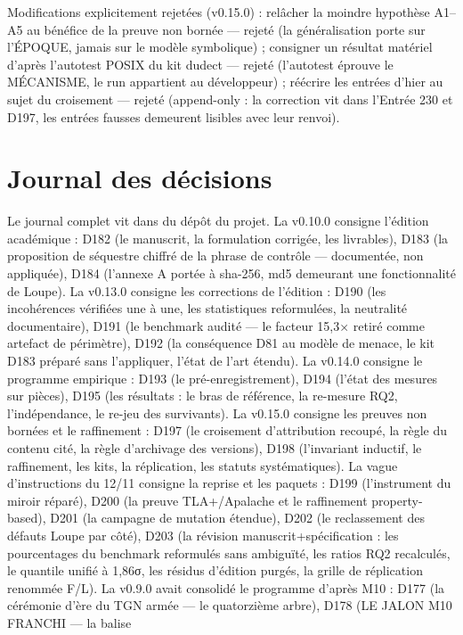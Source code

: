 Modifications explicitement rejetées (v0.15.0) : relâcher la moindre
hypothèse A1--A5 au bénéfice de la preuve non bornée — rejeté (la
généralisation porte sur l'ÉPOQUE, jamais sur le modèle symbolique) ;
consigner un résultat matériel d'après l'autotest POSIX du kit dudect —
rejeté (l'autotest éprouve le MÉCANISME, le run appartient au
développeur) ; réécrire les entrées d'hier au sujet du croisement —
rejeté (append-only : la correction vit dans l'Entrée 230 et D197, les
entrées fausses demeurent lisibles avec leur renvoi).

\section{Journal des décisions}\label{sec:decisions}

Le journal complet vit dans  du dépôt du projet. La
v0.10.0 consigne l'édition académique : D182 (le manuscrit, la formulation
corrigée, les livrables), D183 (la proposition de séquestre chiffré de la
phrase de contrôle — documentée, non appliquée), D184 (l'annexe A portée à
sha-256, md5 demeurant une fonctionnalité de Loupe). La v0.13.0 consigne
les corrections de l'édition : D190 (les incohérences vérifiées une à une,
les statistiques reformulées, la neutralité documentaire), D191 (le
benchmark audité — le facteur 15,3× retiré comme artefact de périmètre),
D192 (la conséquence D81 au modèle de menace, le kit D183 préparé sans
l'appliquer, l'état de l'art étendu). La v0.14.0 consigne le programme
empirique : D193 (le pré-enregistrement), D194 (l'état des mesures sur
pièces), D195 (les résultats : le bras de référence, la re-mesure RQ2,
l'indépendance, le re-jeu des survivants). La v0.15.0 consigne les
preuves non bornées et le raffinement : D197 (le croisement
d'attribution recoupé, la règle du contenu cité, la règle
d'archivage des versions), D198 (l'invariant inductif, le
raffinement, les kits, la réplication, les statuts systématiques). La
vague d'instructions du 12/11 consigne la reprise et les paquets :
D199 (l'instrument du miroir réparé), D200 (la preuve TLA+/Apalache et
le raffinement property-based), D201 (la campagne de mutation étendue),
D202 (le reclassement des défauts Loupe par côté), D203 (la révision
manuscrit+spécification : les pourcentages du benchmark reformulés sans
ambiguïté, les ratios RQ2 recalculés, le quantile unifié à 1,86σ, les
résidus d'édition purgés, la grille de réplication renommée F/L). La v0.9.0 avait
consolidé le programme d'après M10 : D177 (la cérémonie d'ère du TGN
armée — le quatorzième arbre), D178 (LE JALON M10 FRANCHI — la balise
